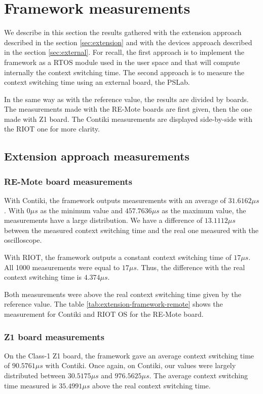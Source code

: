 \section{Framework measurements}

We describe in this section the results gathered with the extension approach described in the section \ref{sec:extension} and with the devices approach described in the section \ref{sec:external}.
For recall, the first approach is to implement the framework as a RTOS module used in the user space and that will compute internally the context switching time.
The second approach is to measure the context switching time using an external board, the PSLab.

In the same way as with the reference value, the results are divided by boards.
The measurements made with the RE-Mote boards are first given, then the one made with Z1 board.
The Contiki measurements are displayed side-by-side with the RIOT one for more clarity.

\subsection{Extension approach measurements}

\subsubsection{RE-Mote board measurements}
With Contiki, the framework outputs measurements with an average of $31.6162\mu s$.
With $0\mu s$ as the minimum value and $457.7636\mu s$ as the maximum value, the measurements have a large distribution.
We have a difference of $13.1112 \mu s$ between the measured context switching time and the real one measured with the oscilloscope.

With RIOT, the framework outputs a constant context switching time of $17\mu s$.
All 1000 measurements were equal to $17\mu s$.
Thus, the difference with the real context switching time is $4.374\mu s$.

Both measurements were above the real context switching time given by the reference value.
The table \ref{tab:extension-framework-remote} shows the measurement for Contiki and RIOT OS for the RE-Mote board.



\subsubsection{Z1 board measurements}
On the Class-1 Z1 board, the framework gave an average context switching time of $90.5761\mu s$ with Contiki.
Once again, on Contiki, our values were largely distributed between $30.5175\mu s$ and $976.5625\mu s$.
The average context switching time measured is $35.4991 \mu s$ above the real context switching time.

